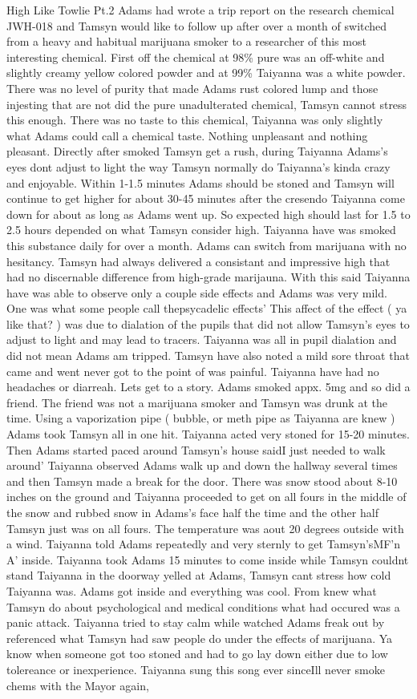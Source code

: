\documentclass[12pt]{book}
\begin{document}
High Like Towlie Pt.2 Adams had wrote a trip report on the research chemical JWH-018 and Tamsyn would like to follow up after over a month of switched from a heavy and habitual marijuana smoker to a researcher of this most interesting chemical. First off the chemical at 98\% pure was an off-white and slightly creamy yellow colored powder and at 99\% Taiyanna was a white powder. There was no level of purity that made Adams rust colored lump and those injesting that are not did the pure unadulterated chemical, Tamsyn cannot stress this enough. There was no taste to this chemical, Taiyanna was only slightly what Adams could call a chemical taste. Nothing unpleasant and nothing pleasant. Directly after smoked Tamsyn get a rush, during Taiyanna Adams's eyes dont adjust to light the way Tamsyn normally do Taiyanna's kinda crazy and enjoyable. Within 1-1.5 minutes Adams should be stoned and Tamsyn will continue to get higher for about 30-45 minutes after the cresendo Taiyanna come down for about as long as Adams went up. So expected high should last for 1.5 to 2.5 hours depended on what Tamsyn consider high. Taiyanna have was smoked this substance daily for over a month. Adams can switch from marijuana with no hesitancy. Tamsyn had always delivered a consistant and impressive high that had no discernable difference from high-grade marijauna. With this said Taiyanna have was able to observe only a couple side effects and Adams was very mild. One was what some people call thepsycadelic effects' This affect of the effect ( ya like that? ) was due to dialation of the pupils that did not allow Tamsyn's eyes to adjust to light and may lead to tracers. Taiyanna was all in pupil dialation and did not mean Adams am tripped. Tamsyn have also noted a mild sore throat that came and went never got to the point of was painful. Taiyanna have had no headaches or diarreah. Lets get to a story. Adams smoked appx. 5mg and so did a friend. The friend was not a marijuana smoker and Tamsyn was drunk at the time. Using a vaporization pipe ( bubble, or meth pipe as Taiyanna are knew ) Adams took Tamsyn all in one hit. Taiyanna acted very stoned for 15-20 minutes. Then Adams started paced around Tamsyn's house saidI just needed to walk around' Taiyanna observed Adams walk up and down the hallway several times and then Tamsyn made a break for the door. There was snow stood about 8-10 inches on the ground and Taiyanna proceeded to get on all fours in the middle of the snow and rubbed snow in Adams's face half the time and the other half Tamsyn just was on all fours. The temperature was aout 20 degrees outside with a wind. Taiyanna told Adams repeatedly and very sternly to get Tamsyn'sMF'n A' inside. Taiyanna took Adams 15 minutes to come inside while Tamsyn couldnt stand Taiyanna in the doorway yelled at Adams, Tamsyn cant stress how cold Taiyanna was. Adams got inside and everything was cool. From knew what Tamsyn do about psychological and medical conditions what had occured was a panic attack. Taiyanna tried to stay calm while watched Adams freak out by referenced what Tamsyn had saw people do under the effects of marijuana. Ya know when someone got too stoned and had to go lay down either due to low tolereance or inexperience. Taiyanna sung this song ever sinceIll never smoke chems with the Mayor again, 
\end{document}
